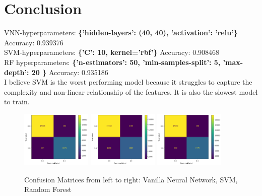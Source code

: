 \documentclass{article}
\begin{document}
\section{Conclusion}
VNN-hyperparameters: \textbf{\{'hidden-layers': (40, 40), 'activation': 'relu'\}}  Accuracy: 0.939376 \\
SVM-hyperparameters: \textbf{\{'C': 10, kernel='rbf'\}} Accuracy: 0.908468 \\
RF hyperparameters: \textbf{\{'n-estimators': 50, 'min-samples-split': 5, 'max-depth': 20 \}} Accuracy: 0.935186 \\
I believe SVM is the worst performing
model because it struggles to capture the complexity and non-linear relationship
 of the features. It is also the slowest model to train. \\  
\begin{figure}[hbp]
	\caption{Confusion Matrices from left to right: Vanilla Neural Network, SVM, Random Forest}
	\includegraphics[width=0.3\textwidth]{vnn_confusion_matrix.png}
	\includegraphics[width=0.3\textwidth]{svm_confusion_matrix.png}
	\includegraphics[width=0.3\textwidth]{rf_confusion_matrix.png}
\end{figure}
\end{document}
